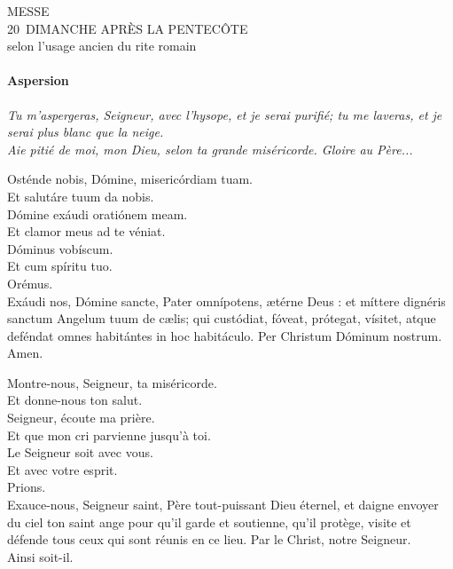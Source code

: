 \documentclass[twoside]{article}
\begin{document}
\null \newpage

\sloppy

\begin{center}\begin{doublespace}
{
\MakeUppercase{\Large Messe\\20\ieme~dimanche après la Pentecôte}\\
selon l'usage ancien du rite romain
}
\end{doublespace}\end{center}

\paragraph{Aspersion}


\emph{\rr Tu m'aspergeras, Seigneur, avec l'hysope, et je serai purifié; tu me laveras, et je serai plus blanc que la neige.\\
\vv Aie pitié de moi, mon Dieu, selon ta grande miséricorde. Gloire au Père...}

\begin{paracol}{2}
\vv Osténde nobis, Dómine, misericórdiam tuam.\\
\rr Et salutáre tuum da nobis.\\
\vv Dómine exáudi oratiónem meam.\\
\rr Et clamor meus ad te véniat.\\
\vv Dóminus vobíscum.\\
\rr Et cum spíritu tuo.\\
\vv Orémus.\\
Exáudi nos, Dómine sancte, Pater omnípotens, ætérne Deus :
et míttere dignéris sanctum Angelum tuum de cælis; qui custódiat,
fóveat, prótegat, vísitet, atque deféndat omnes habitántes in hoc habitáculo.
Per Christum Dóminum nostrum.\\
\rr Amen.

\switchcolumn

\vv Montre-nous, Seigneur, ta miséricorde.\\
\rr Et donne-nous ton salut.\\
\vv Seigneur, écoute ma prière.\\
\rr Et que mon cri parvienne jusqu’à toi.\\
\vv Le Seigneur soit avec vous.\\
\rr Et avec votre esprit.\\
\vv Prions. \\
Exauce-nous, Seigneur saint, Père tout-puissant Dieu éternel,
et daigne envoyer du ciel ton saint ange pour qu’il garde et soutienne,
qu’il protège, visite et défende tous ceux qui sont réunis en ce lieu.
Par le Christ, notre Seigneur.\\
\rr Ainsi soit-il.

\end{paracol}
\end{document}
